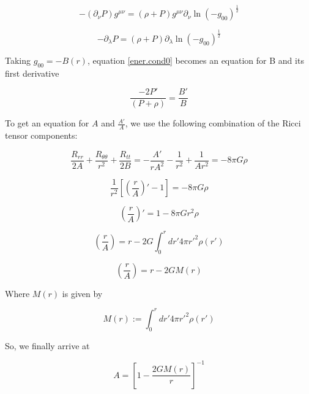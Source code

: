 \begin{equation}
-(\partial_\nu P) g^{\mu \nu} = (\rho+ P) g^{\mu \nu} \partial_\nu \ln{(-g_{00})^{\frac{1}{2}}}
\end{equation}

\begin{equation}\label{ener.cond0}
-\partial_\lambda P  = (\rho+ P)  \partial_\lambda \ln{(-g_{00})^{\frac{1}{2}}}
\end{equation}

Taking $g_{00} = -B(r)$, equation \ref{ener.cond0} becomes an equation for B and its first derivative

\begin{equation}\label{B'/B}
\frac{-2P'}{(P+\rho)} = \frac{B'}{B}
\end{equation}


To get an equation for $A$ and $\frac{A'}{A}$, we use the following combination of the Ricci tensor components:

\begin{equation}
\frac{R_{rr}}{2A} +\frac{R_{\theta \theta}}{r^2} + \frac{R_{tt}}{2B} = -\frac{A'}{rA^2} - \frac{1}{r^2} + \frac{1}{A r^2} = -8\pi G \rho
\end{equation}

\begin{equation}
\frac{1}{r^2} \left[ \left(\frac{r}{A} \right)' - 1 \right] = -8\pi G \rho
\end{equation}

\begin{equation}
 \left(\frac{r}{A}\right)' = 1 - 8\pi G r^2 \rho
\end{equation}

\begin{equation}
\left(\frac{r}{A}\right) = r - 2G \int_0^r dr'4\pi  r'^2 \rho(r')
\end{equation}

\begin{equation}
\left(\frac{r}{A}\right) = r - 2G M(r)
\end{equation}

Where $M(r)$ is given by

\begin{equation}\label{oreijf}
M(r):= \int_0^r dr'4\pi  r'^2 \rho(r')
\end{equation}


So, we finally arrive at 

\begin{equation}\label{A}
A = \left[ 1 - \frac{2G M(r)}{r} \right]^{-1}
\end{equation}


